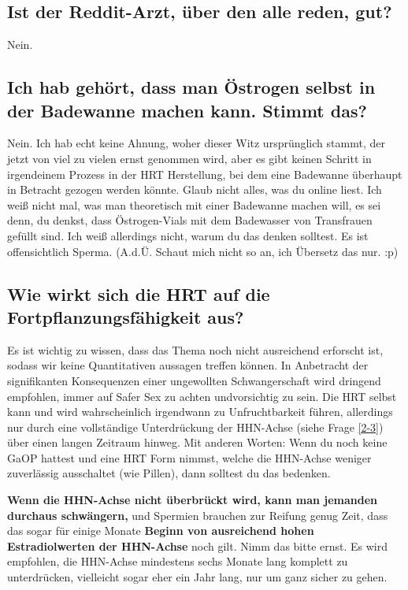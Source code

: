 \documentclass{article}
\begin{document}
\subsection{Ist der Reddit-Arzt, über den alle reden, gut?}

Nein.

\subsection{Ich hab gehört, dass man Östrogen selbst in der Badewanne machen kann. Stimmt das?}

Nein. Ich hab echt keine Ahnung, woher dieser Witz ursprünglich stammt, der jetzt von viel zu vielen ernst genommen wird, aber es gibt keinen Schritt in irgendeinem Prozess in der HRT Herstellung, bei dem eine Badewanne überhaupt in Betracht gezogen werden könnte. Glaub nicht alles, was du online liest. Ich weiß nicht mal, was man theoretisch mit einer Badewanne machen will, es sei denn, du denkst, dass Östrogen-Vials mit dem Badewasser von Transfrauen gefüllt sind. Ich weiß allerdings nicht, warum du das denken solltest. Es ist offensichtlich Sperma. (A.d.Ü. Schaut mich nicht so an, ich Übersetz das nur. :p)

\subsection{Wie wirkt sich die HRT auf die Fortpflanzungsfähigkeit aus?}\label{11-42}

Es ist wichtig zu wissen, dass das Thema noch nicht ausreichend erforscht ist, sodass wir keine Quantitativen aussagen treffen können. In Anbetracht der signifikanten Konsequenzen einer ungewollten Schwangerschaft wird dringend empfohlen, immer auf Safer Sex zu achten undvorsichtig zu sein. Die HRT selbst kann und wird wahrscheinlich irgendwann zu Unfruchtbarkeit führen, allerdings nur durch eine vollständige Unterdrückung der HHN-Achse (siehe Frage \ref{2-3}) über einen langen Zeitraum hinweg. Mit anderen Worten: Wenn du noch keine GaOP hattest und eine HRT Form nimmst, welche die HHN-Achse weniger zuverlässig ausschaltet (wie Pillen), dann solltest du das bedenken.

\textbf{Wenn die HHN-Achse nicht überbrückt wird, kann man jemanden durchaus schwängern,} und Spermien brauchen zur Reifung genug Zeit, dass das sogar für einige Monate \textbf{Beginn von ausreichend hohen Estradiolwerten der HHN-Achse} noch gilt. Nimm das bitte ernst. Es wird empfohlen, die HHN-Achse mindestens sechs Monate lang komplett zu unterdrücken, vielleicht sogar eher ein Jahr lang, nur um ganz sicher zu gehen.
\end{document}

